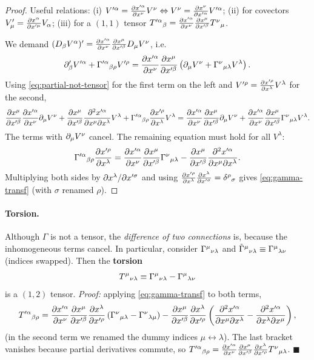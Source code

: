 \begin{proof}
Useful relations: (i) $V'^\alpha=\frac{\partial x'^\alpha}{\partial x^\nu}V^\nu\Leftrightarrow V^\nu=\frac{\partial x^\nu}{\partial x'^\alpha}V'^\alpha$; (ii) for covectors $V'_\mu=\frac{\partial x^\alpha}{\partial x'^\mu}V_\alpha$; (iii) for a $(1,1)$ tensor $T'^\alpha{}_\beta=\frac{\partial x'^\alpha}{\partial x^\nu}\frac{\partial x^\mu}{\partial x'^\beta}T^\nu{}_\mu$.

We demand $(D_\beta V^\alpha)'=\frac{\partial x'^\alpha}{\partial x^\nu}\frac{\partial x^\mu}{\partial x'^\beta}D_\mu V^\nu$, i.e.
\[
  \partial'_\beta V'^\alpha+\Gamma'^\alpha{}_{\beta\rho}V'^\rho
  =\frac{\partial x'^\alpha}{\partial x^\nu}\frac{\partial x^\mu}{\partial x'^\beta}\left(\partial_\mu V^\nu+\Gamma^{\nu}{}_{\mu\lambda}V^\lambda\right).
\]
Using \eqref{eq:partial-not-tensor} for the first term on the left and $V'^\rho=\frac{\partial x'^\rho}{\partial x^\lambda}V^\lambda$ for the second,
\[
  \frac{\partial x^\mu}{\partial x'^\beta}\frac{\partial x'^\alpha}{\partial x^\nu}\partial_\mu V^\nu
  +\frac{\partial x^\mu}{\partial x'^\beta}\frac{\partial^2x'^\alpha}{\partial x^\mu\partial x^\lambda}V^\lambda
  +\Gamma'^\alpha{}_{\beta\rho}\frac{\partial x'^\rho}{\partial x^\lambda}V^\lambda
  =\frac{\partial x'^\alpha}{\partial x^\nu}\frac{\partial x^\mu}{\partial x'^\beta}\partial_\mu V^\nu+\frac{\partial x'^\alpha}{\partial x^\nu}\frac{\partial x^\mu}{\partial x'^\beta}\Gamma^{\nu}{}_{\mu\lambda}V^\lambda .
\]
The terms with $\partial_\mu V^\nu$ cancel. The remaining equation must hold for all $V^\lambda$:
\[
  \Gamma'^\alpha{}_{\beta\rho}\frac{\partial x'^\rho}{\partial x^\lambda}
  =\frac{\partial x'^\alpha}{\partial x^\nu}\frac{\partial x^\mu}{\partial x'^\beta}\Gamma^{\nu}{}_{\mu\lambda}-\frac{\partial x^\mu}{\partial x'^\beta}\frac{\partial^2x'^\alpha}{\partial x^\mu\partial x^\lambda}.
\]
Multiplying both sides by $\partial x^\lambda/\partial x'^\sigma$ and using $\frac{\partial x'^\rho}{\partial x^\lambda}\frac{\partial x^\lambda}{\partial x'^\sigma}=\delta^\rho{}_\sigma$ gives \eqref{eq:gamma-transf} (with $\sigma$ renamed $\rho$).
\end{proof}

\paragraph{Torsion.} Although $\Gamma$ is not a tensor, the \emph{difference of two connections} is, because the inhomogeneous terms cancel. In particular, consider $\Gamma^{\mu}{}_{\nu\lambda}$ and $\tilde\Gamma^\mu{}_{\nu\lambda}\equiv\Gamma^{\mu}{}_{\lambda\nu}$ (indices swapped). Then the \textbf{torsion}
\begin{equation}
  T^\mu{}_{\nu\lambda}\equiv\Gamma^{\mu}{}_{\nu\lambda}-\Gamma^{\mu}{}_{\lambda\nu}
\end{equation}
is a $(1,2)$ tensor. \textit{Proof:} applying \eqref{eq:gamma-transf} to both terms,
\[
  T'^\alpha{}_{\beta\rho}=\frac{\partial x'^\alpha}{\partial x^\nu}\frac{\partial x^\mu}{\partial x'^\beta}\frac{\partial x^\lambda}{\partial x'^\rho}\left(\Gamma^{\nu}{}_{\mu\lambda}-\Gamma^{\nu}{}_{\lambda\mu}\right)
  -\frac{\partial x^\mu}{\partial x'^\beta}\frac{\partial x^\lambda}{\partial x'^\rho}\left(\frac{\partial^2x'^\alpha}{\partial x^\mu\partial x^\lambda}-\frac{\partial^2x'^\alpha}{\partial x^\lambda\partial x^\mu}\right),
\]
(in the second term we renamed the dummy indices $\mu\leftrightarrow\lambda$). The last bracket vanishes because partial derivatives commute, so $T'^\alpha{}_{\beta\rho}=\frac{\partial x'^\alpha}{\partial x^\nu}\frac{\partial x^\mu}{\partial x'^\beta}\frac{\partial x^\lambda}{\partial x'^\rho}T^\nu{}_{\mu\lambda}$. $\blacksquare$

